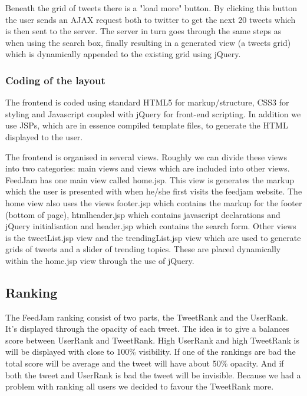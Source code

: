 Beneath the grid of tweets there is a "load more" button. By clicking this button the user sends an AJAX request both to twitter to get the next 20 tweets which is then sent to the server. The server in turn goes through the same steps as when using the search box, finally resulting in a generated view (a tweets grid) which is dynamically appended to the existing grid using jQuery.


\subsubsection{Coding of the layout}
The frontend is coded using standard HTML5 for markup/structure, CSS3 for styling and Javascript coupled with jQuery for front-end scripting. In addition we use JSPs, which are in essence compiled template files, to generate the HTML displayed to the user.

The frontend is organised in several views. Roughly we can divide these views into two categories: main views and views which are included into other views. FeedJam has one main view called home.jsp. This view is generates the markup which the user is presented with when he/she first visits the feedjam website. The home view also uses the views footer.jsp which contains the markup for the footer (bottom of page), htmlheader.jsp which contains javascript declarations and jQuery initialisation and header.jsp which contains the search form. Other views is the tweetList.jsp view and the trendingList.jsp view which are used to generate grids of tweets and a slider of trending topics. These are placed dynamically within the home.jsp view through the use of jQuery.


\subsection{Ranking} %
\label{ranking}
The FeedJam ranking consist of two parts, the TweetRank and the UserRank. It's displayed through the opacity of each tweet. The idea is to give a balances score between UserRank and TweetRank. High UserRank and high TweetRank  is will be displayed with close to 100\% visibility. If one of the rankings are bad the total score will be average and the tweet will have about 50\% opacity. And if both the tweet and UserRank is bad the tweet will be invisible. Because we had a problem with ranking all users we decided to favour the TweetRank more.

